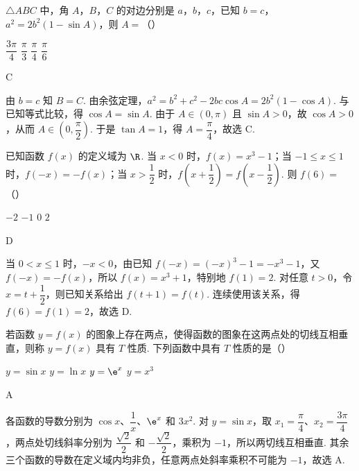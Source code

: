 \begin{problem}
\(\triangle ABC\) 中，角 \(A\)，\(B\)，\(C\) 的对边分别是 \(a\)，\(b\)，\(c\)，已知 \(b=c\)，\(a^2=2b^2\left(1-\sin A\right)\)，则 \(A=\)（\quad）

\choices
    {\(\dfrac{3\pi}{4}\)}
    {\(\dfrac{\pi}{3}\)}
    {\(\dfrac{\pi}{4}\)}
    {\(\dfrac{\pi}{6}\)}
\end{problem}

\begin{answer}
C
\end{answer}

\begin{solution}
由 \(b=c\) 知 \(B=C\). 由余弦定理，\(a^2=b^2+c^2-2bc\cos A=2b^2(1-\cos A)\). 与已知等式比较，得 \(\cos A=\sin A\). 由于 \(A\in(0,\pi)\) 且 \(\sin A>0\)，故 \(\cos A>0\)，从而 \(A\in\left(0,\dfrac\pi2\right)\). 于是 \(\tan A=1\)，得 \(A=\dfrac\pi4\)，故选 C.
\end{solution}

\begin{problem}
已知函数 \(f(x)\) 的定义域为 \(\R\). 当 \(x<0\) 时，\(f(x)=x^3-1\)；当 \(-1\leq x\leq 1\) 时，\(f(-x)=-f(x)\)；当 \(x>\dfrac12\) 时，\(f\left(x+\dfrac12\right)=f\left(x-\dfrac12\right)\). 则 \(f(6)=\)（\quad）

\choices
    {\(-2\)}
    {\(-1\)}
    {\(0\)}
    {\(2\)}
\end{problem}

\begin{answer}
D
\end{answer}

\begin{solution}
当 \(0<x\leq1\) 时，\(-x<0\)，由已知 \(f(-x)=(-x)^3-1=-x^3-1\)，又 \(f(-x)=-f(x)\)，所以 \(f(x)=x^3+1\)，特别地 \(f(1)=2\). 对任意 \(t>0\)，令 \(x=t+\dfrac12\)，则已知关系给出 \(f(t+1)=f(t)\). 连续使用该关系，得 \(f(6)=f(1)=2\)，故选 D.
\end{solution}

\begin{problem}
若函数 \(y=f(x)\) 的图象上存在两点，使得函数的图象在这两点处的切线互相垂直，则称 \(y=f(x)\) 具有 \(T\) 性质. 下列函数中具有 \(T\) 性质的是（\quad）

\choices
    {\(y=\sin x\)}
    {\(y=\ln x\)}
    {\(y=\e^x\)}
    {\(y=x^3\)}
\end{problem}

\begin{answer}
A
\end{answer}

\begin{solution}
各函数的导数分别为 \(\cos x\)、\(\dfrac1x\)、\(\e^x\) 和 \(3x^2\). 对 \(y=\sin x\)，取 \(x_1=\dfrac\pi4\)、\(x_2=\dfrac{3\pi}4\)，两点处切线斜率分别为 \(\dfrac{\sqrt2}{2}\) 和 \(-\dfrac{\sqrt2}{2}\)，乘积为 \(-1\)，所以两切线互相垂直. 其余三个函数的导数在定义域内均非负，任意两点处斜率乘积不可能为 \(-1\)，故选 A.
\end{solution}

